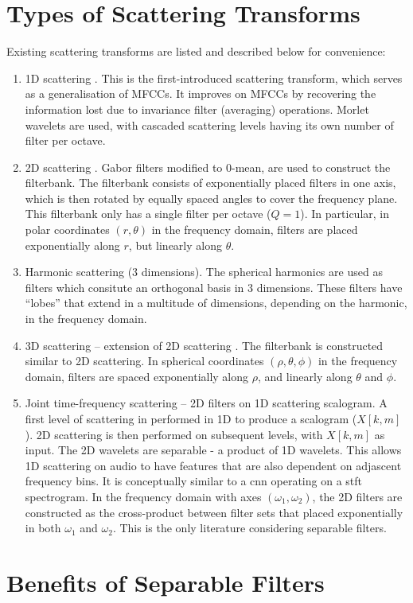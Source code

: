 \section{Types of Scattering Transforms}
Existing scattering transforms are listed and described below for convenience:
\begin{enumerate}
    \item 1D scattering \citep{1dscattering1, ws}. This is the first-introduced scattering transform, which serves as a generalisation of MFCCs. It improves on MFCCs by recovering the information lost due to invariance filter (averaging) operations. Morlet wavelets are used, with cascaded scattering levels having its own number of filter per octave.
    \item 2D scattering \citep{2dscattering}. Gabor filters modified to 0-mean, are used to construct the filterbank. The filterbank consists of exponentially placed filters in one axis, which is then rotated by equally spaced angles to cover the frequency plane. This filterbank only has a single filter per octave ($Q=1$). In particular, in polar coordinates $(r, \theta)$ in the frequency domain, filters are placed exponentially along $r$, but linearly along $\theta$.
    \item Harmonic scattering \citep{harmonicscattering} (3 dimensions). The spherical harmonics are used as filters which consitute an orthogonal basis in 3 dimensions. These filters have ``lobes'' that extend in a multitude of dimensions, depending on the harmonic, in the frequency domain.
    \item 3D scattering -- extension of 2D scattering \citep{3dscattering}. The filterbank is constructed similar to 2D scattering. In spherical coordinates $(\rho, \theta, \phi)$ in the frequency domain, filters are spaced exponentially along $\rho$, and linearly along $\theta$ and $\phi$.
    \item Joint time-frequency \citep{ws_joint_tf,jointtfscattering2} scattering -- 2D filters on 1D scattering scalogram. A first level of scattering in performed in 1D to produce a scalogram ($X[k, m]$). 2D scattering is then performed on subsequent levels, with $X[k, m]$ as input. The 2D wavelets are separable - a product of 1D wavelets. This allows 1D scattering on audio to have features that are also dependent on adjascent frequency bins. It is conceptually similar to a \ac{cnn} operating on a \ac{stft} spectrogram. In the frequency domain with axes $(\omega_1, \omega_2)$, the 2D filters are constructed as the cross-product between filter sets that placed exponentially in both $\omega_1$ and $\omega_2$.
    This is the only literature considering separable filters.
\end{enumerate}

\section{Benefits of Separable Filters}
\label{sec:p3i:sep}


